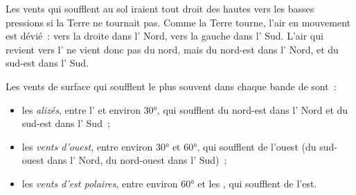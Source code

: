 Les vents qui soufflent au sol iraient tout droit des hautes vers les
basses pressions si la Terre ne tournait pas. Comme la Terre tourne, l'air
en mouvement est dévié~: vers la droite dans l' Nord, vers la
gauche dans l' Sud. L'air qui revient vers l' ne vient
donc pas du nord, mais du nord-est dans l' Nord, et du sud-est
dans l' Sud.

\begin{definition}\label{def:g8:winds-global-circulation:global-winds}
Les vents de surface qui soufflent le plus souvent dans chaque bande de
 sont~:
\begin{itemize}
  \item les \emph{alizés}, entre l' et
        environ \ang{30}, qui soufflent du nord-est dans l' Nord
        et du sud-est dans l' Sud~;
  \item les \emph{vents d'ouest}, entre environ
        \ang{30} et \ang{60}, qui soufflent de l'ouest (du sud-ouest dans
        l' Nord, du nord-ouest dans l' Sud)~;
  \item les \emph{vents d'est polaires}, entre
        environ \ang{60} et les , qui soufflent de l'est.
\end{itemize}
\end{definition}

